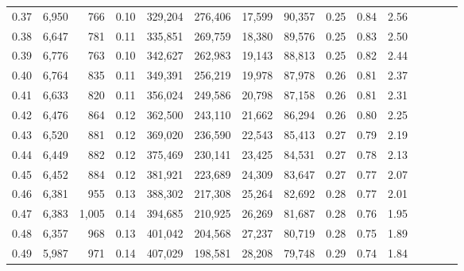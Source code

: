 \begin{tabular}{rrrcrrrrrrrrrrr}
0.37 &   6,950 &     766 &                                       0.10 &  329,204 &  276,406 &   17,599 &   90,357 &  0.25 &  0.84 &                         2.56 \\
0.38 &   6,647 &     781 &                                       0.11 &  335,851 &  269,759 &   18,380 &   89,576 &  0.25 &  0.83 &                         2.50 \\
0.39 &   6,776 &     763 &                                       0.10 &  342,627 &  262,983 &   19,143 &   88,813 &  0.25 &  0.82 &                         2.44 \\
0.40 &   6,764 &     835 &                                       0.11 &  349,391 &  256,219 &   19,978 &   87,978 &  0.26 &  0.81 &                         2.37 \\
0.41 &   6,633 &     820 &                                       0.11 &  356,024 &  249,586 &   20,798 &   87,158 &  0.26 &  0.81 &                         2.31 \\
0.42 &   6,476 &     864 &                                       0.12 &  362,500 &  243,110 &   21,662 &   86,294 &  0.26 &  0.80 &                         2.25 \\
0.43 &   6,520 &     881 &                                       0.12 &  369,020 &  236,590 &   22,543 &   85,413 &  0.27 &  0.79 &                         2.19 \\
0.44 &   6,449 &     882 &                                       0.12 &  375,469 &  230,141 &   23,425 &   84,531 &  0.27 &  0.78 &                         2.13 \\
0.45 &   6,452 &     884 &                                       0.12 &  381,921 &  223,689 &   24,309 &   83,647 &  0.27 &  0.77 &                         2.07 \\
0.46 &   6,381 &     955 &                                       0.13 &  388,302 &  217,308 &   25,264 &   82,692 &  0.28 &  0.77 &                         2.01 \\
0.47 &   6,383 &   1,005 &                                       0.14 &  394,685 &  210,925 &   26,269 &   81,687 &  0.28 &  0.76 &                         1.95 \\
0.48 &   6,357 &     968 &                                       0.13 &  401,042 &  204,568 &   27,237 &   80,719 &  0.28 &  0.75 &                         1.89 \\
0.49 &   5,987 &     971 &                                       0.14 &  407,029 &  198,581 &   28,208 &   79,748 &  0.29 &  0.74 &                         1.84 \\

\end{tabular}
